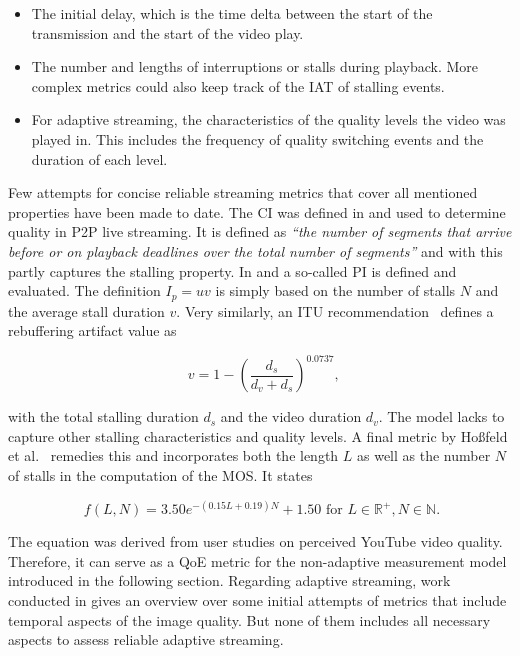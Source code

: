 \begin{itemize}
	\item The initial delay, which is the time delta between the start of the transmission and the start of the video play.

	\item The number and lengths of interruptions or stalls during playback. More complex metrics could also keep track of the \acrshort{IAT} of stalling events.

	\item For adaptive streaming, the characteristics of the quality levels the video was played in. This includes the frequency of quality switching events and the duration of each level.
\end{itemize}

Few attempts for concise reliable streaming metrics that cover all mentioned properties have been made to date. The \gls{CI} was defined in \cite{1498486} and used to determine quality in \gls{P2P} live streaming. It is defined as \textit{\enquote{the number of segments that arrive before or on playback deadlines over the total number of segments}} and with this partly captures the stalling property. In \cite{5634160} and \cite{DBLP:journals/corr/SeyedebrahimiBP13} a so-called \gls{PI} is defined and evaluated. The definition $I_p = uv$ is simply based on the number of stalls $N$ and the average stall duration $v$. Very similarly, an \gls{ITU} recommendation~\cite{ituP1202.1} defines a rebuffering artifact value as 

\begin{equation}
	\phantom{,}v = 1 - {\left(\frac{d_s}{d_v + d_s}\right)}^{0.0737}\text{,}
\end{equation}

 with the total stalling duration $d_s$ and the video duration $d_v$. The model lacks to capture other stalling characteristics and quality levels. A final metric by Hoßfeld et al.~\cite{hossfeld2013youtubeqoe} remedies this and incorporates both the length $L$ as well as the number $N$ of stalls in the computation of the \gls{MOS}. It states

\begin{equation}
	\phantom{.} f(L,N) = 3.50e^{-(0.15L +0.19)N} + 1.50 \text{ for } L \in \mathbb{R}^{+}, N \in \mathbb{N}.
\label{c3:eqn:hossfeld-stalling-model}
\end{equation}

The equation was derived from user studies on perceived YouTube video quality. Therefore, it can serve as a \gls{QoE} metric for the non-adaptive measurement model introduced in the following section. Regarding adaptive streaming, work conducted in \cite{6603210} gives an overview over some initial attempts of metrics that include temporal aspects of the image quality. But none of them includes all necessary aspects to assess reliable adaptive streaming.

